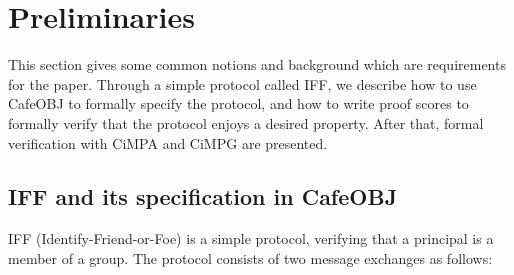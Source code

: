 \documentclass[a4paper,fleqn]{cas-dc}
\begin{document}

\section{Preliminaries}\label{pre}
This section gives some common notions and background which are requirements for the paper. 
Through a simple protocol called IFF, we describe how to use CafeOBJ to formally specify the protocol, and how to write proof scores to formally verify that the protocol enjoys a desired property.
After that, formal verification with CiMPA and CiMPG are presented.

\subsection{IFF and its specification in CafeOBJ} \label{cafeobj}
%
IFF (Identify-Friend-or-Foe) \cite{iff2001} is a simple protocol, verifying that a principal is a member of a group. The protocol consists of two message exchanges as follows:
	
\end{document}
